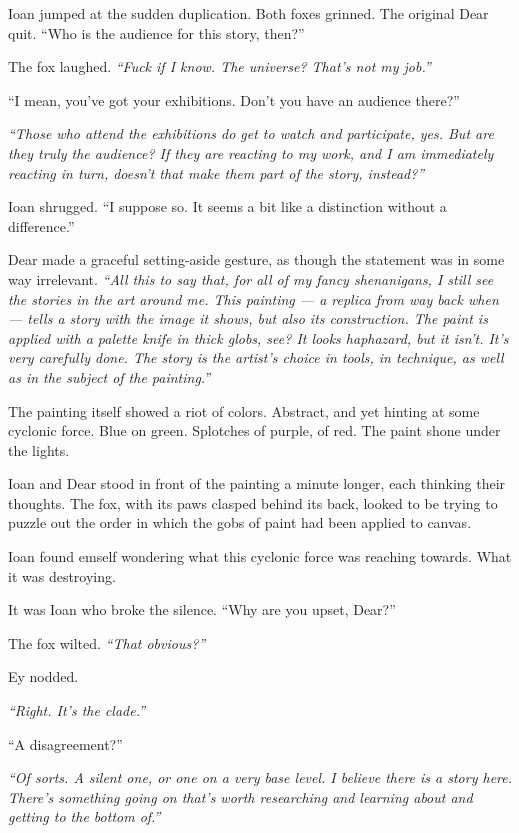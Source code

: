Ioan jumped at the sudden duplication. Both foxes grinned. The original Dear quit. ``Who is the audience for this story, then?''

The fox laughed. \emph{``Fuck if I know. The universe? That's not my job.''}

``I mean, you've got your exhibitions. Don't you have an audience there?''

\emph{``Those who attend the exhibitions do get to watch and participate, yes. But are they truly the audience? If they are reacting to my work, and I am immediately reacting in turn, doesn't that make them part of the story, instead?''}

Ioan shrugged. ``I suppose so. It seems a bit like a distinction without a difference.''

Dear made a graceful setting-aside gesture, as though the statement was in some way irrelevant. \emph{``All this to say that, for all of my fancy shenanigans, I still see the stories in the art around me. This painting — a replica from way back when — tells a story with the image it shows, but also its construction. The paint is applied with a palette knife in thick globs, see? It looks haphazard, but it isn't. It's very carefully done. The story is the artist's choice in tools, in technique, as well as in the subject of the painting.''}

The painting itself showed a riot of colors. Abstract, and yet hinting at some cyclonic force. Blue on green. Splotches of purple, of red. The paint shone under the lights.

Ioan and Dear stood in front of the painting a minute longer, each thinking their thoughts. The fox, with its paws clasped behind its back, looked to be trying to puzzle out the order in which the gobs of paint had been applied to canvas.

Ioan found emself wondering what this cyclonic force was reaching towards. What it was destroying.

It was Ioan who broke the silence. ``Why are you upset, Dear?''

The fox wilted. \emph{``That obvious?''}

Ey nodded.

\emph{``Right. It's the clade.''}

``A disagreement?''

\emph{``Of sorts. A silent one, or one on a very base level. I believe there is a story here. There's something going on that's worth researching and learning about and getting to the bottom of.''}

